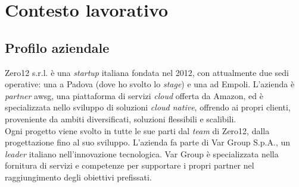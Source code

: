 

\chapter{Contesto lavorativo}
\label{cap:introduzione}
\section{Profilo aziendale}
Zero12 s.r.l. è una \textit{startup} italiana fondata nel 2012, con attualmente due sedi operative: una a Padova (dove ho svolto lo \textit{stage}) e una ad Empoli. 
L'azienda è \textit{partner} \gls{awsg}, una piattaforma di servizi \textit{cloud} offerta da Amazon, ed è specializzata nello sviluppo di soluzioni \textit{cloud native}, offrendo ai propri clienti, proveniente da ambiti diversificati, soluzioni flessibili e scalibili.\\
Ogni progetto viene svolto in tutte le sue parti dal \textit{team} di Zero12, dalla progettazione fino al suo sviluppo. L’azienda fa parte di Var Group S.p.A., un \textit{leader} italiano nell’innovazione tecnologica. Var Group è specializzata nella fornitura di servizi e competenze per supportare i propri partner nel raggiungimento degli obiettivi prefissati.
